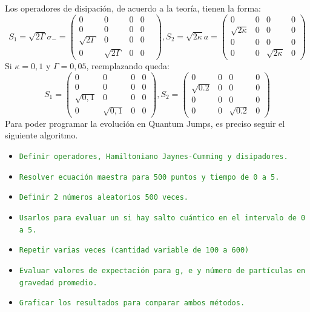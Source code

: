 \documentclass{book}
\begin{document}
Los operadores de disipación, de acuerdo a la teoría, tienen la forma: 
\begin{equation}{S_1= \sqrt{2\Gamma}\sigma_-=\begin{pmatrix} 0&0&0&0& \\ 0&0&0&0 \\ \sqrt{2\Gamma}&0&0&0 \\ 0&\sqrt{2\Gamma} & 0&0 \end{pmatrix}, S_2=\sqrt{2\kappa}a=\begin{pmatrix} 0&0&0&0 \\ \sqrt{2\kappa}&0&0&0 \\ 0&0&0&0 \\ 0&0&\sqrt{2\kappa}&0\end{pmatrix} }\end{equation}
Si ${\kappa=0,1}$ y ${\Gamma=0,05}$, reemplazando queda:
\begin{equation}{S_1=\begin{pmatrix}0&0&0&0\\0&0&0&0\\ \sqrt{0,1}&0&0&0\\ 0&\sqrt{0,1}&0&0 \end{pmatrix},S_2=\begin{pmatrix}0&0&0&0 \\ \sqrt{0.2}&0&0&0 \\ 0&0&0&0 \\ 0&0&\sqrt{0.2}&0\end{pmatrix}}\end{equation}
Para poder programar la evolución en Quantum Jumps, es preciso seguir el siguiente algoritmo.
\begin{itemize}
\item\textcolor{ForestGreen}{\texttt{Definir operadores, Hamiltoniano Jaynes-Cumming y disipadores.}}
\item\textcolor{ForestGreen}{\texttt{Resolver ecuación maestra para 500 puntos y tiempo de 0 a 5.}}
\item\textcolor{ForestGreen}{\texttt{Definir 2 números aleatorios 500 veces.}}
\item\textcolor{ForestGreen}{\texttt{Usarlos para evaluar un si hay salto cuántico en el intervalo de 0 a 5.}}
\item\textcolor{ForestGreen}{\texttt{Repetir varias veces (cantidad variable de 100 a 600)}}
\item\textcolor{ForestGreen}{\texttt{Evaluar valores de expectación para g, e y número de partículas en gravedad promedio.}}
\item\textcolor{ForestGreen}{\texttt{Graficar los resultados para comparar ambos métodos.}}
\end{itemize}
\end{document}
